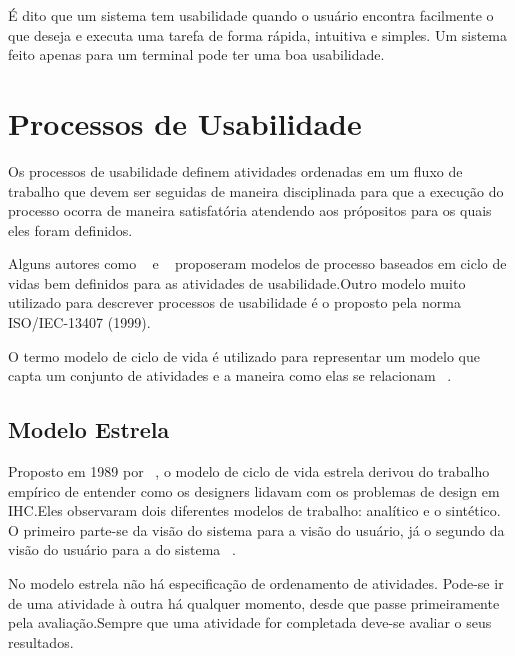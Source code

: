 É dito que um sistema tem usabilidade quando o usuário encontra facilmente o que deseja e executa uma tarefa de forma rápida, intuitiva e simples. Um sistema feito apenas para um terminal pode ter uma boa usabilidade.



\section{Processos de Usabilidade}

	Os processos de usabilidade definem atividades ordenadas em um fluxo de trabalho que devem ser seguidas de maneira disciplinada para que a execução do processo ocorra de maneira satisfatória atendendo aos própositos para os quais eles foram definidos. %

	Alguns autores como ~ e ~ proposeram modelos de processo baseados em ciclo de vidas bem definidos para as atividades de usabilidade.Outro modelo muito utilizado para descrever processos de usabilidade é o proposto pela norma ISO/IEC-13407 (1999).

	O termo modelo de ciclo de vida é utilizado para representar um modelo que capta um conjunto de atividades e a maneira como elas se relacionam ~\cite{preece2007}.

\subsection{Modelo Estrela}

	Proposto em 1989 por ~\citeauthor{hix1993}, o modelo de ciclo de vida estrela derivou do trabalho empírico de entender como os designers lidavam com os problemas de design em IHC.Eles observaram dois diferentes modelos de trabalho: analítico e o sintético. O primeiro parte-se da visão do sistema para a visão do usuário, já o segundo da visão do usuário para a do sistema ~\cite{cybis2010}.

	No modelo estrela não há especificação de ordenamento de atividades. Pode-se ir de uma atividade à outra há qualquer momento, desde que passe primeiramente pela avaliação.Sempre que uma atividade for completada deve-se avaliar o seus resultados.

